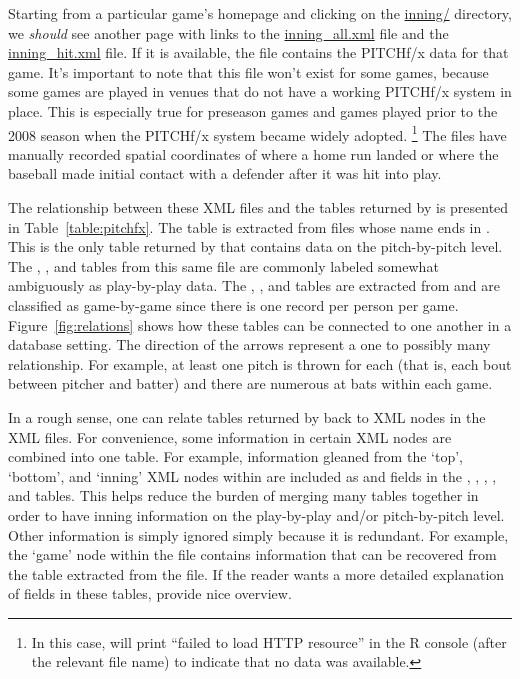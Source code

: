 \begin{article}
Starting from a particular game's homepage and clicking on the \href{http://gd2.mlb.com/components/game/mlb/year_2011/month_02/day_26/gid_2011_02_26_phimlb_nyamlb_1/inning/}{inning/}
directory, we \emph{should} see another page with links to the \href{http://gd2.mlb.com/components/game/mlb/year_2011/month_02/day_26/gid_2011_02_26_phimlb_nyamlb_1/inning/inning_all.xml}{inning\_all.xml}
file and the \href{http://gd2.mlb.com/components/game/mlb/year_2011/month_02/day_26/gid_2011_02_26_phimlb_nyamlb_1/inning/inning_hit.xml}{inning\_hit.xml}
file. If it is available, the  file contains
the PITCHf/x data for that game. It's important to note that this
file won't exist for some games, because some games are played in
venues that do not have a working PITCHf/x system in place. This is
especially true for preseason games and games played prior to the
2008 season when the PITCHf/x system became widely adopted.%
\footnote{In this case,  will print ``failed to load HTTP resource''
in the R console (after the relevant file name) to indicate that no
data was available.%
} The  files have manually recorded spatial
coordinates of where a home run landed or where the baseball made
initial contact with a defender after it was hit into play.

The relationship between these XML files and the tables returned by
 is presented in Table~\ref{table:pitchfx}. The 
table is extracted from files whose name ends in .
This is the only table returned by  that contains data
on the pitch-by-pitch level. The , , 
and  tables from this same file are commonly labeled somewhat
ambiguously as play-by-play data. The , ,
and  tables are extracted from  and
are classified as game-by-game since there is one record per person
per game. Figure~\ref{fig:relations} shows how these tables can
be connected to one another in a database setting. The direction of
the arrows represent a one to possibly many relationship. For example,
at least one pitch is thrown for each  (that is, each
bout between pitcher and batter) and there are numerous at bats within
each game. 

In a rough sense, one can relate tables returned by 
back to XML nodes in the XML files. For convenience, some information
in certain XML nodes are combined into one table. For example, information
gleaned from the `top', `bottom', and `inning' XML nodes within 
are included as  and  fields in
the , , , , and
 tables. This helps reduce the burden of merging many
tables together in order to have inning information on the play-by-play
and/or pitch-by-pitch level. Other information is simply ignored simply
because it is redundant. For example, the `game' node within the 
file contains information that can be recovered from the 
table extracted from the  file. If the reader
wants a more detailed explanation of fields in these tables, \citet{baseball}
provide nice overview. 


\end{article}
